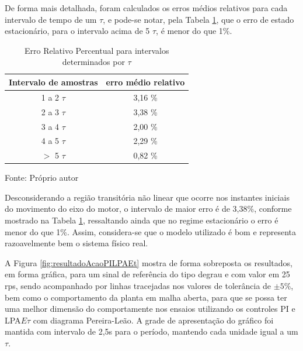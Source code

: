 De forma mais detalhada, 
foram calculados os erros médios relativos para cada intervalo de 
tempo de um $\tau$, 
e pode-se notar, 
pela Tabela \ref{tab:resultadoErroModeloTau}, 
que o erro de estado estacionário, para o intervalo acima de 5 $\tau$, é menor do que 1\%. 


\begin{table}[h]
\centering
\caption{Erro Relativo Percentual para intervalos determinados por $\tau$ }
\label{tab:resultadoErroModeloTau}

\begin{tabular}{c|c}
\hline
Intervalo de amostras  &  erro médio relativo \\ \hline
\hline
1 a 2 $\tau$ &  3,16 \% \\ \hline
2 a 3 $\tau$ &  3,38 \% \\ \hline
3 a 4 $\tau$ &  2,00 \% \\ \hline
4 a 5 $\tau$ &  2,29 \% \\ \hline
$>$ 5 $\tau$ &  0,82 \% \\ \hline
\end{tabular}

{\vspace{0.2cm} \small Fonte: Próprio autor}
\end{table}

Desconsiderando a região transitória não linear 
que ocorre nos instantes iniciais do movimento do eixo do motor, 
o intervalo de maior erro é de 3,38\%, 
conforme mostrado na Tabela \ref{tab:resultadoErroModeloTau},
ressaltando ainda que no regime estacionário 
o erro é menor do que 1\%.
Assim, considera-se que o modelo utilizado é bom e representa razoavelmente bem o sistema físico real.

A Figura \ref{fig:resultadoAcaoPILPAEt} mostra de forma sobreposta os
resultados, em forma gráfica, para um sinal de referência do tipo
degrau e com valor em 25 rps, sendo acompanhado por linhas tracejadas
nos valores de tolerância de  $\pm 5\%$, bem como o comportamento da
planta em malha aberta, para que se possa ter uma melhor dimensão
do comportamente nos ensaios utilizando os controles PI e LPA$E\tau$ com diagrama Pereira-Leão.
A grade de apresentação do gráfico foi mantida com intervalo de 2,5s para o
período, mantendo cada unidade igual a um $\tau$. 





